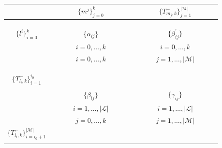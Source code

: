\documentclass[12pt]{article}
\theoremstyle{definition}
\begin{document}
\begin{center}
\begin{tabular}{c|ccccccc:ccccccc} 
			                   &   & &  &$\big \lbrace  m^j  \big \rbrace_{j=0}^k$ & & & & & & &$\big \lbrace T_{m_j,k}^- \big \rbrace_{j=1}^{\vert \mathcal{M}\vert}$ & &  & \\ \hline
&&&&&&&&&&&&&& \\
&&&&&&&&&&&&&& \\
&&&&&&&&&&&&&& \\
$\big \lbrace  l^i  \big \rbrace_{i=0}^k$ &&&&$\big \lbrace \alpha_{ij} \big \rbrace$&&&&&&&$\big \lbrace \beta^\prime_{ij} \big \rbrace$&&&\\
&&&&$i=0,\dots,k$&&&&&&& $i=0,\dots,k$&&& \\
&&&&$i=0,\dots,k$&&&&&&&$j=1,\dots,\vert \mathcal{M}\vert$&&& \\
&&&&&&&&&&&&&&\\
&&&&&&&&&&&&&&\\ \hdashline
&&&&&&&&&&&&&& \\
$\big \lbrace T_{l_i,k}^- \big \rbrace_{i=1}^{i_0}$ &&&&&&&&&&&&&&\\
&&&&&&&&&&&&&& \\ 
&&&& $\big \lbrace \beta_{ij} \big \rbrace$ &&&&&&&$\big \lbrace \gamma_{ij} \big \rbrace$&&& \\
&&&&$i=1,\dots,\vert \mathcal{L} \vert$&&&&&&&$i=1,\dots,\vert \mathcal{L} \vert$&&& \\ 
&&&&$j=0,\dots,k$&&&&&&&$j=1,\dots,\vert \mathcal{M} \vert$&&& \\ 
$\big \lbrace T_{l_i,k}^- \big \rbrace_{i=i_0+1}^{\vert \mathcal{M}\vert}$ &&&&&&&&&&&&&&\\
&&&&&&&&&&&&&& \\ 
\end{tabular}
\end{center}



\vspace{5in}
\end{document}
